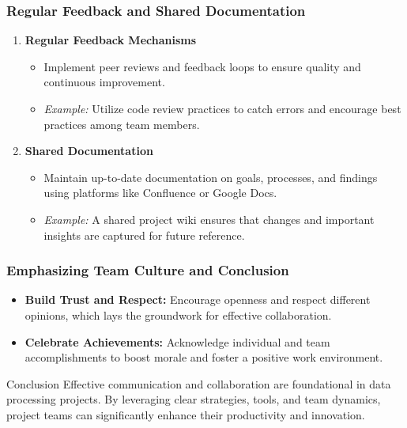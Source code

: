 \documentclass[aspectratio=169]{beamer}
\begin{document}
\begin{frame}[fragile]
    \frametitle{Regular Feedback and Shared Documentation}
    \begin{enumerate}
        \item \textbf{Regular Feedback Mechanisms}
        \begin{itemize}
            \item Implement peer reviews and feedback loops to ensure quality and continuous improvement.
            \item \textit{Example:} Utilize code review practices to catch errors and encourage best practices among team members.
        \end{itemize}
        
        \item \textbf{Shared Documentation}
        \begin{itemize}
            \item Maintain up-to-date documentation on goals, processes, and findings using platforms like Confluence or Google Docs.
            \item \textit{Example:} A shared project wiki ensures that changes and important insights are captured for future reference.
        \end{itemize}
    \end{enumerate}
\end{frame}

\begin{frame}[fragile]
    \frametitle{Emphasizing Team Culture and Conclusion}
    \begin{itemize}
        \item \textbf{Build Trust and Respect:} 
        Encourage openness and respect different opinions, which lays the groundwork for effective collaboration.
        
        \item \textbf{Celebrate Achievements:}
        Acknowledge individual and team accomplishments to boost morale and foster a positive work environment.
    \end{itemize}

    \begin{block}{Conclusion}
        Effective communication and collaboration are foundational in data processing projects. 
        By leveraging clear strategies, tools, and team dynamics, project teams can significantly enhance their productivity and innovation.
    \end{block}
\end{frame}
\end{document}
